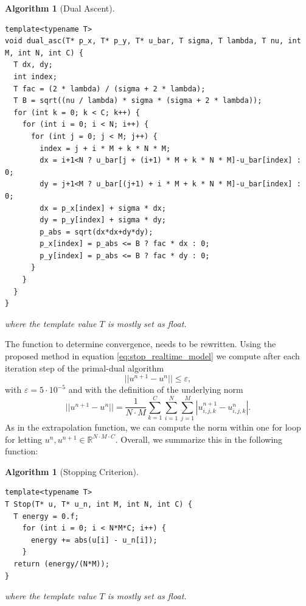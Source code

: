 \documentclass{scrreprt}
\newtheorem{algorithm}[theorem]{Algorithm}
\begin{document}
            \begin{algorithm}[Dual Ascent]
                \begin{lstlisting}
template<typename T>
void dual_asc(T* p_x, T* p_y, T* u_bar, T sigma, T lambda, T nu, int M, int N, int C) {
  T dx, dy;
  int index;
  T fac = (2 * lambda) / (sigma + 2 * lambda);
  T B = sqrt((nu / lambda) * sigma * (sigma + 2 * lambda));
  for (int k = 0; k < C; k++) {
    for (int i = 0; i < N; i++) {
      for (int j = 0; j < M; j++) {
        index = j + i * M + k * N * M;
        dx = i+1<N ? u_bar[j + (i+1) * M + k * N * M]-u_bar[index] : 0;
        dy = j+1<M ? u_bar[(j+1) + i * M + k * N * M]-u_bar[index] : 0;
        dx = p_x[index] + sigma * dx;
        dy = p_y[index] + sigma * dy;
        p_abs = sqrt(dx*dx+dy*dy);
        p_x[index] = p_abs <= B ? fac * dx : 0;
        p_y[index] = p_abs <= B ? fac * dy : 0;
      }
    }
  }
}
                \end{lstlisting}
                where the template value $T$ is mostly set as float.
            \end{algorithm}

        The function to determine convergence, needs to be rewritten. Using the proposed method in equation \ref{eq:stop_realtime_model} we compute after each iteration step of the primal-dual algorithm
            $$
                ||u^{n+1} - u^{n}|| \le \varepsilon,
            $$
        with $\varepsilon = 5 \cdot 10^{-5}$ and with the definition of the underlying norm
            $$
                ||u^{n+1} - u^{n}|| = \frac{1}{N \cdot M} \sum_{k = 1}^{C} \sum_{i = 1}^{N} \sum_{j = 1}^{M} |u_{i,j,k}^{n+1} - u_{i,j,k}^{n}|.
            $$
        As in the extrapolation function, we can compute the norm within one for loop for letting $u^{n}, u^{n+1} \in \mathbb{R}^{N \cdot M \cdot C}$. Overall, we summarize this in the following function:

            \begin{algorithm}[Stopping Criterion]
                    \label{alg:stop_realtime}
                        \begin{lstlisting}
template<typename T>
T Stop(T* u, T* u_n, int M, int N, int C) {
  T energy = 0.f;
    for (int i = 0; i < N*M*C; i++) {
      energy += abs(u[i] - u_n[i]);
    }
  return (energy/(N*M));
}
                    \end{lstlisting}
                    where the template value $T$ is mostly set as float.
                \end{algorithm}
\end{document}
